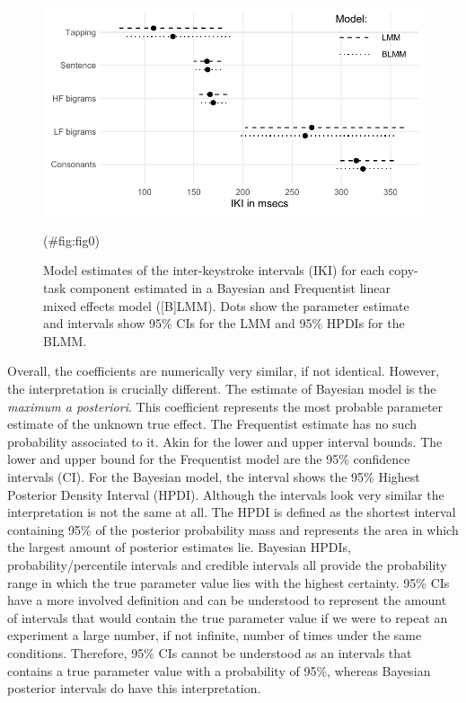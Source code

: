 \begin{appendix}
\begin{figure}[!h]

{\centering \includegraphics{ct_files/figure-latex/fig0-1} 

}

\caption{\label{fig:lmms}Model estimates of the inter-keystroke intervals (IKI) for each copy-task component estimated in a Bayesian and Frequentist linear mixed effects model ([B]LMM). Dots show the parameter estimate and intervals show 95\% CIs for the LMM and 95\% HPDIs for the BLMM.}(\#fig:fig0)
\end{figure}

Overall, the coefficients are numerically very similar, if not
identical. However, the interpretation is crucially different. The
estimate of Bayesian model is the \textit{maximum a posteriori}. This
coefficient represents the most probable parameter estimate of the
unknown true effect. The Frequentist estimate has no such probability
associated to it. Akin for the lower and upper interval bounds. The
lower and upper bound for the Frequentist model are the 95\% confidence
intervals (CI). For the Bayesian model, the interval shows the 95\%
Highest Posterior Density Interval (HPDI). Although the intervals look
very similar the interpretation is not the same at all. The HPDI is
defined as the shortest interval containing 95\% of the posterior
probability mass and represents the area in which the largest amount of
posterior estimates lie. Bayesian HPDIs, probability/percentile
intervals and credible intervals all provide the probability range in
which the true parameter value lies with the highest certainty. 95\% CIs
have a more involved definition and can be understood to represent the
amount of intervals that would contain the true parameter value if we
were to repeat an experiment a large number, if not infinite, number of
times under the same conditions. Therefore, 95\% CIs cannot be
understood as an intervals that contains a true parameter value with a
probability of 95\%, whereas Bayesian posterior intervals do have this
interpretation.


\end{appendix}
